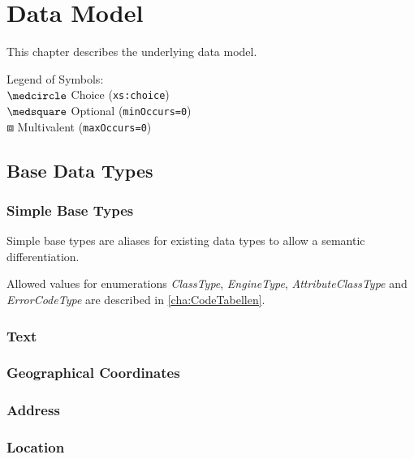 \chapter{Data Model}
\label{cha:Datenmodell}
This chapter describes the underlying data model. \medskip

\noindent Legend of Symbols:\\
$\medcircle$ Choice (\verb|xs:choice|)\\
$\medsquare$ Optional (\verb|minOccurs=0|)\\
$\boxbox$ Multivalent (\verb|maxOccurs=0|)\\


\section{Base Data Types}
\label{sec:Datenmodell:Basisdatentypen}

\subsection*{Simple Base Types}
Simple base types are aliases for existing data types to allow a semantic differentiation.


Allowed values for enumerations \emph{ClassType}, \emph{EngineType}, \emph{AttributeClassType} and \emph{ErrorCodeType} are described in \autoref{cha:CodeTabellen}.

\subsection*{Text}



\subsection*{Geographical Coordinates}



\subsection*{Address}



\subsection*{Location}



